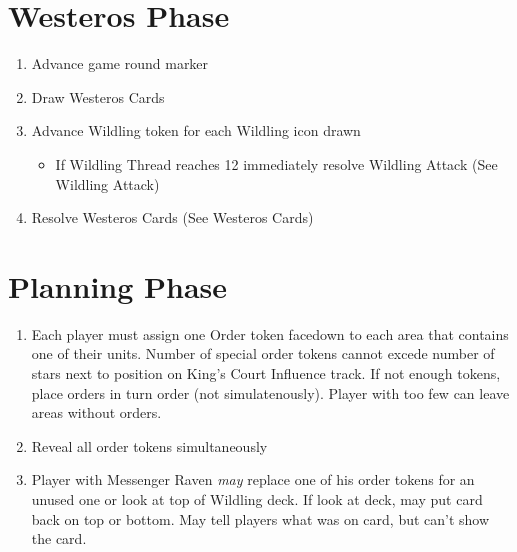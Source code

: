 \documentclass[12pt]{article}
\newenvironment{enumerateCustom}
{\begin{enumerate}
  \setlength{\itemsep}{1pt}
  \setlength{\parskip}{0pt}
  \setlength{\parsep}{0pt}}
{\end{enumerate}}
\newenvironment{itemizeCustom}
{\begin{itemize}
  \setlength{\itemsep}{1pt}
  \setlength{\parskip}{0pt}
  \setlength{\parsep}{0pt}}
{\end{itemize}}
\begin{document}
\begin{multicols*}{2}
\section*{Westeros Phase}
\begin{enumerateCustom}
	\item Advance game round marker
	\item Draw Westeros Cards
	\item Advance Wildling token for each Wildling icon drawn 
	\begin{itemizeCustom}
		\item If Wildling Thread reaches 12 immediately resolve Wildling Attack (See Wildling Attack)
	\end{itemizeCustom}
	\item Resolve Westeros Cards (See Westeros Cards)
\end{enumerateCustom}

\section*{Planning Phase}
\begin{enumerateCustom}
	\item Each player must assign one Order token facedown to each area that contains one of their units. Number of special order tokens cannot excede number of stars next to position on King's Court Influence track. If not enough tokens, place orders in turn order (not simulatenously). Player with too few can leave areas without orders.
	\item Reveal all order tokens simultaneously
	\item Player with Messenger Raven \emph{may} replace one of his order tokens for an unused one or look at top of Wildling deck. If look at deck, may put card back on top or bottom. May tell players what was on card, but can't show the card.
\end{enumerateCustom}


\end{multicols*}
\end{document}
